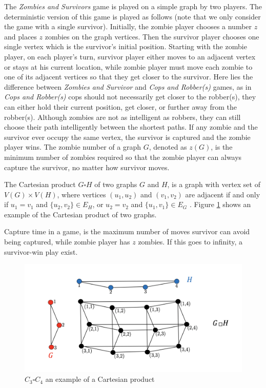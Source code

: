 \documentclass[1p]{elsarticle}
\begin{document}
The {\it Zombies and Survivors} game is played on a simple graph by two players. The deterministic version of this game
\cite{Fitz16} is played as follows (note that we only consider the game with a single survivor). Initially, the zombie
player chooses a number $z$ and places $z$ zombies on the graph vertices. Then the survivor player chooses one single
vertex which is the survivor's initial position. Starting with the zombie player, on each player's turn, survivor player
either moves to an adjacent vertex or stays at his current location, while zombie player must move each zombie to one of
its adjacent vertices so that they get closer to the survivor. Here lies the difference between {\it Zombies and
Survivor} and {\it Cops and Robber(s)} games, as in {\it Cops and Robber(s)} cops should not necessarily get closer to
the robber(s), they can either hold their current position, get closer, or further away from the robber(s). Although
zombies are not as intelligent as robbers, they can still choose their path intelligently between the shortest paths.
If any zombie and the survivor ever occupy the same vertex, the survivor is captured and the zombie player wins. The
zombie number of a graph $G$, denoted as $z(G)$, is the minimum number of zombies required so that the zombie player can
always capture the survivor, no matter how survivor moves.

The Cartesian product $G \square H$ of two graphs $G$ and $H$, is a graph with vertex set of $V(G) \times V(H)$, where
vertices $(u_1 , u_2)$ and $(v_1 , v_2)$ are adjacent if and only if $u_1 = v_1$ and $ \{ u_2 , v_2 \} \in E_{H} $, or
$u_2 = v_2$ and $ \{u_1 , v_1 \} \in E_{G}$ \cite{West02}. Figure \ref{fig:p2} shows an example of the Cartesian product
of two graphs.

Capture time in a game, is the maximum number of moves survivor can avoid being captured, while zombie player has $z$
zombies. If this goes to infinity, a survivor-win play exist.

\begin{figure}[h!]
	\centering
	\includegraphics[width=0.9\linewidth]{fig/CpWest.png}
	\caption{$C_3 \square C_4$ an example of a Cartesian product}
	\label{fig:p2}
\end{figure}
\end{document}
